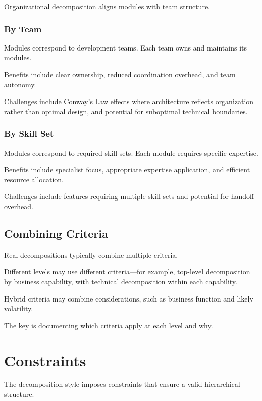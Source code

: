 \documentclass[11pt]{article}
\begin{document}
Organizational decomposition aligns modules with team structure.

\subsubsection{By Team}

Modules correspond to development teams. Each team owns and maintains its modules.

Benefits include clear ownership, reduced coordination overhead, and team autonomy.

Challenges include Conway's Law effects where architecture reflects organization rather than optimal design, and potential for suboptimal technical boundaries.

\subsubsection{By Skill Set}

Modules correspond to required skill sets. Each module requires specific expertise.

Benefits include specialist focus, appropriate expertise application, and efficient resource allocation.

Challenges include features requiring multiple skill sets and potential for handoff overhead.

\subsection{Combining Criteria}

Real decompositions typically combine multiple criteria.

Different levels may use different criteria---for example, top-level decomposition by business capability, with technical decomposition within each capability.

Hybrid criteria may combine considerations, such as business function and likely volatility.

The key is documenting which criteria apply at each level and why.

\section{Constraints}

The decomposition style imposes constraints that ensure a valid hierarchical structure.
\end{document}
